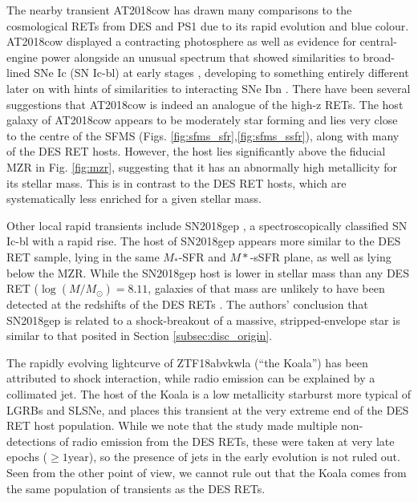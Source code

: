 \documentclass[fleqn,usenatbib,]{mnras}
\begin{document}
The nearby transient AT2018cow has drawn many comparisons to the cosmological RETs from DES and PS1 \citep[e.g.][]{Perley2019,Margutti2019,Fox2019,Mohan2020} due to its rapid evolution and blue colour. AT2018cow displayed a contracting photosphere as well as evidence for central-engine power alongside an unusual spectrum that showed similarities to broad-lined SNe Ic (SN Ic-bl) at early stages \citep[e.g.][]{Xu2018,Izzo2018} , developing to something entirely different later on \citep{Perley2019} with hints of similarities to interacting SNe Ibn \citep{Fox2019}. There have been several suggestions that AT2018cow is indeed an analogue of the high-z RETs. The host galaxy of AT2018cow appears to be moderately star forming and lies very close to the centre of the SFMS (Figs. \ref{fig:sfms_sfr},\ref{fig:sfms_ssfr}), along with many of the DES RET hosts. However, the host lies significantly above the fiducial MZR in Fig. \ref{fig:mzr}, suggesting that it has an abnormally high metallicity for its stellar mass. This is in contrast to the DES RET hosts, which are systematically less enriched for a given stellar mass. 

Other local rapid transients include SN2018gep \citep{Ho2019}, a spectroscopically classified SN Ic-bl with a rapid rise. The host of SN2018gep appears more similar to the DES RET sample, lying in the same $M_*$-SFR and $M*$-sSFR plane, as well as lying below the MZR. While the SN2018gep host is lower in stellar mass than any DES RET ($\log \left(M/M_{\odot}\right) =8.11$, galaxies of that mass are unlikely to have been detected at the redshifts of the DES RETs \citep{Wiseman2020}. The authors' conclusion that SN2018gep is related to a shock-breakout of a massive, stripped-envelope star is similar to that posited in Section \ref{subsec:disc_origin}. 

The rapidly evolving lightcurve of ZTF18abvkwla (``the Koala'') has been attributed to shock interaction, while radio emission can be explained by a collimated jet. The host of the Koala is a low metallicity starburst more typical of LGRBs and SLSNe, and places this transient at the very extreme end of the DES RET host population. While we note that the \citet{Ho2020} study made multiple non-detections of radio emission from the DES RETs, these were taken at very late epochs ($\geq 1\mathrm{year}$), so the presence of jets in the early evolution is not ruled out. Seen from the other point of view, we cannot rule out that the Koala comes from the same population of transients as the DES RETs.
\end{document}
